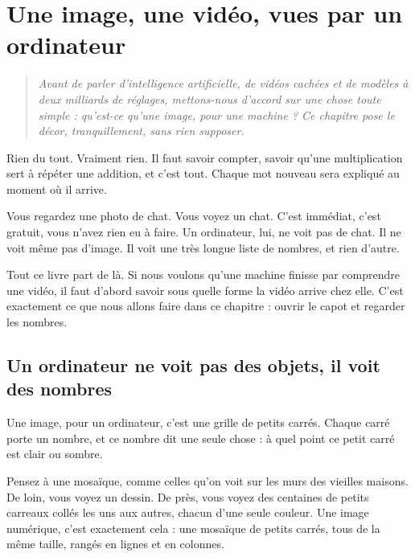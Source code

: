 \chapter{Une image, une vidéo, vues par un ordinateur}
\label{chap:image-video}

\begin{quote}\itshape
Avant de parler d'intelligence artificielle, de vidéos cachées et de
modèles à deux milliards de réglages, mettons-nous d'accord sur une chose
toute simple : qu'est-ce qu'une image, pour une machine ? Ce chapitre pose
le décor, tranquillement, sans rien supposer.
\end{quote}

\begin{prerequis}
Rien du tout. Vraiment rien. Il faut savoir compter, savoir qu'une
multiplication sert à répéter une addition, et c'est tout. Chaque mot
nouveau sera expliqué au moment où il arrive.
\end{prerequis}

Vous regardez une photo de chat. Vous voyez un chat. C'est immédiat, c'est
gratuit, vous n'avez rien eu à faire. Un ordinateur, lui, ne voit pas de
chat. Il ne voit même pas d'image. Il voit une très longue liste de
nombres, et rien d'autre.

Tout ce livre part de là. Si nous voulons qu'une machine finisse par
comprendre une vidéo, il faut d'abord savoir sous quelle forme la vidéo
arrive chez elle. C'est exactement ce que nous allons faire dans ce
chapitre : ouvrir le capot et regarder les nombres.

\section{Un ordinateur ne voit pas des objets, il voit des nombres}

\begin{enclair}
Une image, pour un ordinateur, c'est une grille de petits carrés. Chaque
carré porte un nombre, et ce nombre dit une seule chose : à quel point ce
petit carré est clair ou sombre.
\end{enclair}

Pensez à une mosaïque, comme celles qu'on voit sur les murs des vieilles
maisons. De loin, vous voyez un dessin. De près, vous voyez des centaines
de petits carreaux collés les uns aux autres, chacun d'une seule couleur.
Une image numérique, c'est exactement cela : une mosaïque de petits
carrés, tous de la même taille, rangés en lignes et en colonnes.

